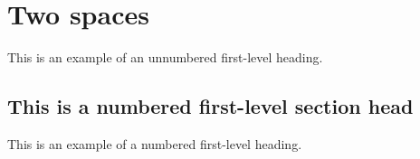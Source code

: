 \section{\label{sec:two spaces}Two spaces}
This is an example of an unnumbered first-level heading.

\subsection{This is a numbered first-level section head}  %
This is an example of a numbered first-level heading.


\endinput  %

